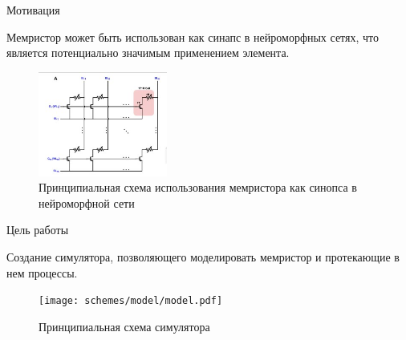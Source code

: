 \documentclass{beamer}%
\begin{document}
\begin{frame}{Мотивация}
\begin{multicols}{2}
Мемристор может быть использован как синапс в нейроморфных сетях, что является потенциально значимым применением элемента.

\columnbreak
    
    \begin{figure}
        \centering
        \includegraphics[width=160px]{img/sinaps-memristor-scheme.jpg}
        \caption{Принципиальная схема использования мемристора как синопса в нейроморфной сети%
        \footnotemark[2]
    }
    \end{figure}
\end{multicols}

\end{frame}


\begin{frame}{Цель работы}

Создание симулятора, позволяющего моделировать мемристор
и протекающие в нем процессы.
\begin{figure}
    \centering
    \texttt{[image: schemes/model/model.pdf]}
    \caption{
        Принципиальная схема симулятора
}
\end{figure}






\end{frame}
\end{document}
